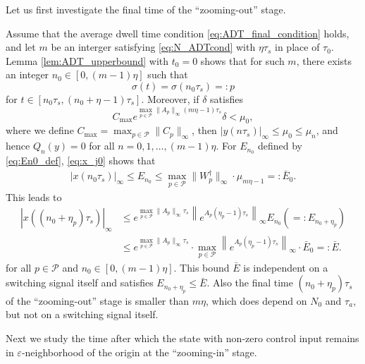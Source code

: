 \documentclass[letterpaper, 11pt, onecolumn]{ieeeconf}  \IEEEoverridecommandlockouts
\begin{document}
Let us first investigate the final time of the ``zooming-out'' stage.

Assume that the average dwell time condition \eqref{eq:ADT_final_condition}
holds, and
let $m$ be an interger satisfying \eqref{eq:N_ADTcond} with 
$\eta \tau_s$ in place of $\tau_0$.
Lemma \ref{lem:ADT_upperbound} with $t_0 = 0$ shows that
for such $m$, there exists 
an integer $n_0 \in[0,(m-1)\eta]$ such that
\[
\sigma(t) = \sigma(n_0\tau_s) =: p
\]
for $t \in [n_0 \tau_s, (n_0+\eta - 1)\tau_s]$.
Moreover, if $\delta$ satisfies
\[
C_{\max} e^{\max_{p \in \mathcal{P}} \|A_p\|_{\infty} 
(m\eta - 1)\tau_s} \delta < \mu_0,
\]
where we define $C_{\max} = \max_{p \in \mathcal{P}} \|C_p\|_{\infty}$,
then $|y(n\tau_s)|_{\infty} \leq \mu_0 \leq \mu_n$, 
and hence $Q_n(y) = 0$ for all $n=0,1,\dots,(m-1)\eta$.
For $E_{n_0}$ defined by \eqref{eq:En0_def},
\eqref{eq:x_j0} shows that
\begin{align*}
|x(n_0\tau_s)|_{\infty} \leq E_{n_0} \leq 
\max_{p \in \mathcal{P}} 
\|W^{\dagger}_p\|_{\infty} \cdot \mu_{m\eta - 1}
=:\bar{E}_0.
\end{align*}
This leads to
\begin{align*}
|x((n_0+\eta_p)\tau_s)|_{\infty} &\leq
e^{\max_{p \in \mathcal{P}} \|A_p\|_{\infty} \tau_s} 
\left\|e^{A_p(\eta_p-1)\tau_s} \right\|_{\infty} 
E_{n_0} (=: E_{n_0+\eta_p}) \\
&\leq 
e^{\max_{p \in \mathcal{P}} \|A_p\|_{\infty} \tau_s} \cdot
\max_{p \in \mathcal{P}} 
\left\|e^{A_p(\eta_p-1)\tau_s}
\right\|_{\infty} \cdot \bar{E}_0
=: \bar E.
\end{align*}
for all $p \in \mathcal{P}$ and $n_0 \in [0,(m-1)\eta]$.
This bound $\bar E$ is independent on a
switching signal itself
and satisfies $E_{n_0+\eta_p} \leq \bar E$.
Also the final time $(n_0+\eta_p)\tau_s$ of the ``zooming-out'' stage
is smaller than $m\eta$, which does depend on $N_0$ and $\tau_a$, but 
not on a switching signal itself.

Next we study the time after which the state with non-zero control input 
remains in $\varepsilon$-neighborhood of the origin at the ``zooming-in'' stage.
\end{document}
